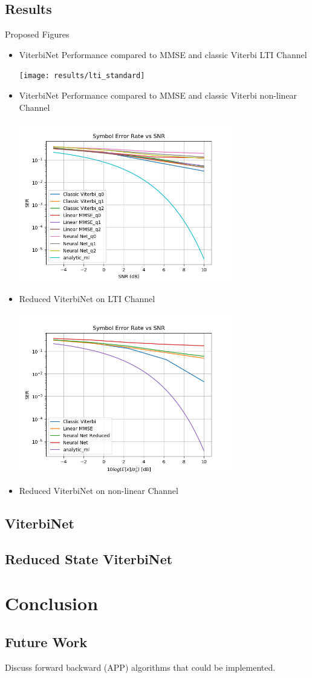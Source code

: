 \documentclass[12pt,a4paper]{report}
\begin{document}
\subsection{Results}
Proposed Figures
\begin{itemize}
\item ViterbiNet Performance compared to MMSE and classic Viterbi LTI Channel

	\texttt{[image: results/lti\_standard]}

\item ViterbiNet Performance compared to MMSE and classic Viterbi non-linear Channel

	\includegraphics[width=\textwidth,height = 7cm]{results/quant_standard}

\item Reduced ViterbiNet on LTI Channel

	\includegraphics[width=\textwidth,height = 7cm]{results/lti_reduced}

\item Reduced ViterbiNet on non-linear Channel

\end{itemize}
\subsection*{ViterbiNet}
\subsection*{Reduced State ViterbiNet}
\section{Conclusion}
\subsection{Future Work}
Discuss forward backward (APP) algorithms that could be implemented.

\newpage

\end{document}
